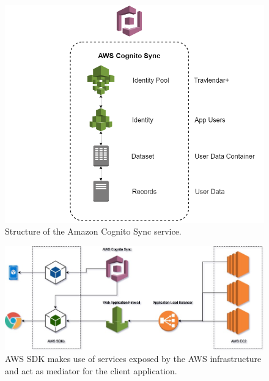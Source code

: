 \begin{figure}[H]
	\centering
	\includegraphics[width=5.5in]{./diagrams/CognitoDiagram.png}
	\caption{Structure of the Amazon Cognito Sync service.}
	\label{fig:seqCognito}
\end{figure}

\begin{figure}[H]
	\centering
	\includegraphics[width=7in]{./diagrams/NetworkDiagram.jpg}
	\caption{AWS SDK makes use of services exposed by the AWS infrastructure and act as mediator for the client application.}
	\label{fig:seqNetworkDiagram}
\end{figure}


